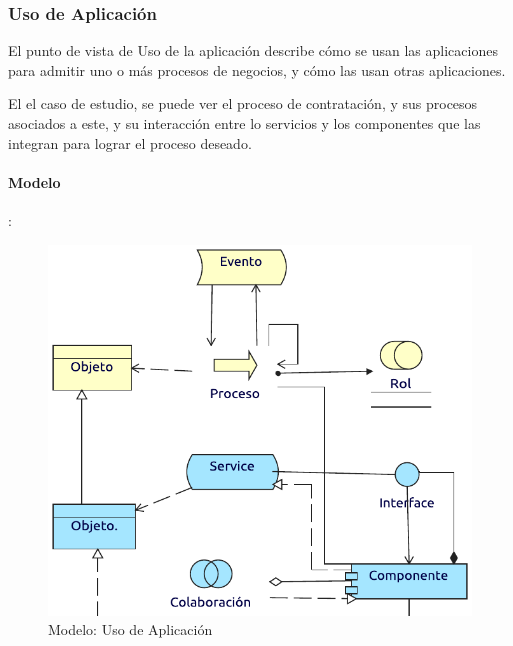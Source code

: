 







\newpage

\subsubsection{Uso de Aplicación}

El punto de vista de Uso de la aplicación describe cómo se usan las aplicaciones para admitir uno o más procesos de negocios, y cómo las usan otras aplicaciones. \vspace{\baselineskip}

El el caso de estudio, se puede ver el proceso de contratación, y sus procesos asociados a este, y su interacción entre lo servicios y los componentes que las integran para lograr el proceso deseado.
\paragraph{Modelo}:
\begin{figure}[h!]
	\centering
	\includegraphics[width=0.9\linewidth]{Desarrollo/ArquitecturaEmpresarial/Aplicacion/imgs/uso.pdf}
	\caption{Modelo: Uso de Aplicación}
\end{figure}
\newpage
